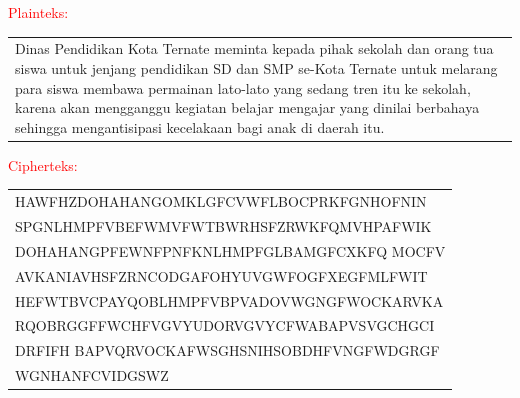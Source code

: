 \documentclass{article}
\begin{document}

\textcolor{red}{Plainteks:}\vspace{2mm}
\begin{center}
\begin{tabular}{|p{}|}
\hline
Dinas Pendidikan Kota Ternate meminta kepada pihak sekolah dan orang tua siswa untuk jenjang pendidikan SD dan SMP se-Kota Ternate untuk melarang para siswa membawa permainan lato-lato yang sedang tren itu ke sekolah, karena akan mengganggu kegiatan belajar mengajar yang dinilai berbahaya sehingga mengantisipasi kecelakaan bagi anak di daerah itu.\hline
\end{tabular}
\end{center}
\vspace{10mm}
\textcolor{red}{Cipherteks:}\vspace{2mm}
\begin{center}
\begin{tabular}{|p{}|}
\hline
HAWFHZDOHAHANGOMKLGFCVWFLBOCPRKFGNHOFNIN \\ SPGNLHMPFVBEFWMVFWTBWRHSFZRWKFQMVHPAFWIK \\ DOHAHANGPFEWNFPNFKNLHMPFGLBAMGFCXKFQ MOCFV \\ AVKANIAVHSFZRNCODGAFOHYUVGWFOGFXEGFMLFWIT \\ HEFWTBVCPAYQOBLHMPFVBPVADOVWGNGFWOCKARVKA \\ RQOBRGGFFWCHFVGVYUDORVGVYCFWABAPVSVGCHGCI \\ DRFIFH BAPVQRVOCKAFWSGHSNIHSOBDHFVNGFWDGRGF \\ WGNHANFCVIDGSWZ \hline
\end{tabular}
\end{center}
\end{document}
